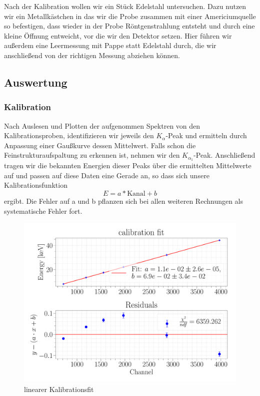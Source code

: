 \documentclass[a4paper,14pt]{article}
\begin{document}
Nach der Kalibration wollen wir ein Stück Edelstahl untersuchen. Dazu nutzen wir ein Metallkästchen in das wir die Probe zusammen mit einer Americiumquelle so befestigen, dass wieder in der Probe Röntgenstrahlung entsteht und durch eine kleine Öffnung entweicht, vor die wir den Detektor setzen. Hier führen wir außerdem eine Leermessung mit Pappe statt Edelstahl durch, die wir anschließend von der richtigen Messung abziehen können.

\subsection{Auswertung}
\subsubsection{Kalibration}
Nach Auslesen und Plotten der aufgenommen Spektren von den Kalibrationsproben, identifizieren wir jeweils den $K_\alpha$-Peak und ermitteln durch Anpassung einer Gaußkurve dessen Mittelwert. Falls schon die Feinstrukturaufspaltung zu erkennen ist, nehmen wir den $K_{\alpha_1}$-Peak. Anschließend tragen wir die bekannten Energien dieser Peaks über die ermittelten Mittelwerte auf und passen auf diese Daten eine Gerade an, so dass sich unsere Kalibrationsfunktion
\begin{equation}
	E = a * \mathrm{Kanal} + b
\end{equation}
ergibt. Die Fehler auf a und b pflanzen sich bei allen weiteren Rechnungen als systematische Fehler fort.

\begin{figure}[H]
\centering
\includegraphics[scale=0.25]{../Figures/am_calibration_fit.pdf}
\caption{linearer Kalibrationsfit}
\label{am_calibration_fit}
\end{figure}
\end{document}
